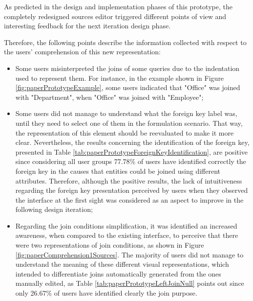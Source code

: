 As predicted in the design and implementation phases of this prototype, the completely redesigned sources editor triggered different points of view and interesting feedback for the next iteration design phase.

Therefore, the following points describe the information collected with respect to the users' comprehension of this new representation:

\begin{itemize}
  \item Some users misinterpreted the joins of some queries due to the indentation used to represent them. For instance, in the example shown in Figure \ref{fig:paperPrototypeExample}, some users indicated that "Office" was joined with "Department", when "Office" was joined with "Employee";
  \item Some users did not manage to understand what the foreign key label was, until they need to select one of them in the formulation scenario. That way, the representation of this element should be reevaluated to make it more clear. Nevertheless, the results concerning the identification of the foreign key, presented in Table \ref{tab:paperPrototypeForeignKeyIdentification}, are positive since considering all user groups 77.78\% of users have identified correctly the foreign key in the causes that entities could be joined using different attributes. Therefore, although the positive results, the lack of intuitiveness regarding the foreign key presentation perceived by users when they observed the interface at the first sight was considered as an aspect to improve in the following design iteration;
  \item Regarding the join conditions simplification, it was identified an increased awareness, when compared to the existing interface, to perceive that there were two representations of join conditions, as shown in Figure \ref{fig:paperComprehension1Sources}. The majority of users did not manage to understand the meaning of these different visual representations, which intended to differentiate joins automatically generated from the ones manually edited, as Table \ref{tab:paperPrototypeLeftJoinNull} points out since only 26.67\% of users have identified clearly the join purpose.
\end{itemize}



